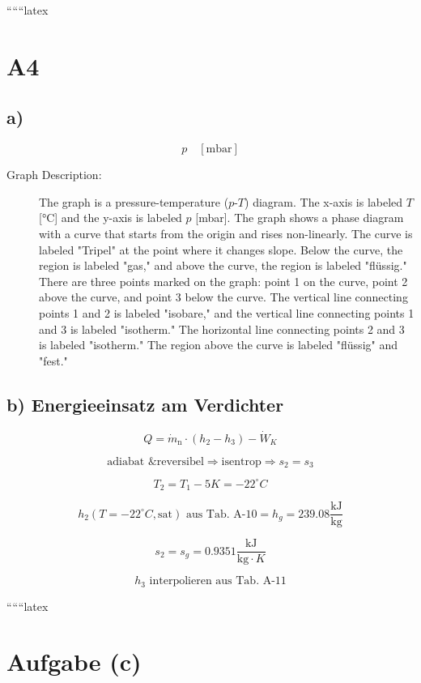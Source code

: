 
``````latex


\section*{A4}

\subsection*{a)}

\[
p \quad [\text{mbar}]
\]

\begin{description}
    \item[Graph Description:] The graph is a pressure-temperature ($p$-$T$) diagram. The x-axis is labeled $T$ [°C] and the y-axis is labeled $p$ [mbar]. The graph shows a phase diagram with a curve that starts from the origin and rises non-linearly. The curve is labeled "Tripel" at the point where it changes slope. Below the curve, the region is labeled "gas," and above the curve, the region is labeled "flüssig." There are three points marked on the graph: point 1 on the curve, point 2 above the curve, and point 3 below the curve. The vertical line connecting points 1 and 2 is labeled "isobare," and the vertical line connecting points 1 and 3 is labeled "isotherm." The horizontal line connecting points 2 and 3 is labeled "isotherm." The region above the curve is labeled "flüssig" and "fest."
\end{description}

\subsection*{b) Energieeinsatz am Verdichter}

\[
Q = \dot{m}_{\text{n}} \cdot (h_2 - h_3) - \dot{W}_K
\]

\[
\text{adiabat \& reversibel} \Rightarrow \text{isentrop} \Rightarrow s_2 = s_3
\]

\[
T_2 = T_1 - 5K = -22^\circ C
\]

\[
h_2 (T = -22^\circ C, \text{sat}) \text{ aus Tab. A-10} = h_g = 239.08 \frac{\text{kJ}}{\text{kg}}
\]

\[
s_2 = s_g = 0.9351 \frac{\text{kJ}}{\text{kg} \cdot K}
\]

\[
h_3 \text{ interpolieren aus Tab. A-11}
\]

``````latex


\section*{Aufgabe (c)}


